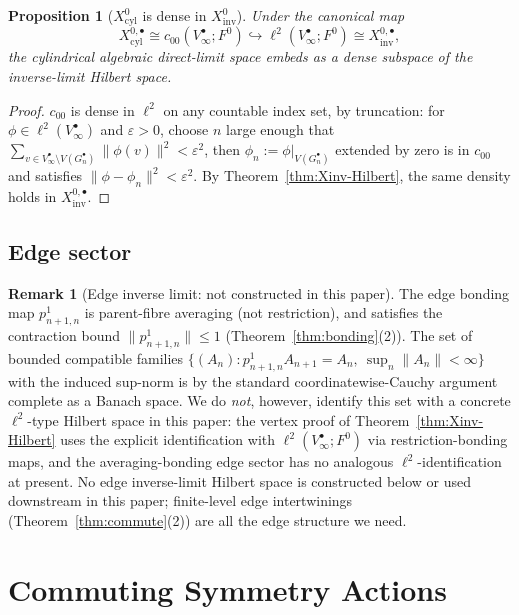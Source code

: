 \documentclass[11pt, a4paper]{amsart}
\newtheorem{proposition}[theorem]{Proposition}
\theoremstyle{definition}
\newtheorem{remark}[theorem]{Remark}
\newcommand{\inv}{\mathrm{inv}}
\newcommand{\cyl}{\mathrm{cyl}}
\begin{document}
\begin{proposition}[$X_\cyl^0$ is dense in $X_\inv^0$]
\label{prop:Xcyl-dense}
Under the canonical map
\[
  X_\cyl^{0, \bullet} \cong c_{00}(V_\infty^\bullet; F^0)
    \hookrightarrow \ell^2(V_\infty^\bullet; F^0) \cong
    X_\inv^{0, \bullet},
\]
the cylindrical algebraic direct-limit space embeds as a dense
subspace of the inverse-limit Hilbert space.
\end{proposition}

\begin{proof}
$c_{00}$ is dense in $\ell^2$ on any countable index set, by
truncation: for $\phi \in \ell^2(V_\infty^\bullet)$ and
$\varepsilon > 0$, choose $n$ large enough that $\sum_{v \in
V_\infty^\bullet \setminus V(G_n^\bullet)} \|\phi(v)\|^2 <
\varepsilon^2$, then $\phi_n := \phi|_{V(G_n^\bullet)}$ extended
by zero is in $c_{00}$ and satisfies $\|\phi - \phi_n\|^2 <
\varepsilon^2$. By Theorem~\ref{thm:Xinv-Hilbert}, the same
density holds in $X_\inv^{0, \bullet}$.
\end{proof}

\subsection{Edge sector}

\begin{remark}[Edge inverse limit: not constructed in this paper]
\label{rmk:edge-inv}
The edge bonding map $p_{n+1, n}^1$ is parent-fibre averaging
(not restriction), and satisfies the contraction bound
$\|p_{n+1,n}^1\| \leq 1$ (Theorem~\ref{thm:bonding}(2)). The set
of bounded compatible families
$\{(A_n) : p_{n+1, n}^1 A_{n+1} = A_n,\ \sup_n \|A_n\| < \infty\}$
with the induced sup-norm is by the standard coordinatewise-Cauchy
argument complete as a Banach space. We do \emph{not}, however,
identify this set with a concrete $\ell^2$-type Hilbert space in
this paper: the vertex proof of
Theorem~\ref{thm:Xinv-Hilbert} uses the explicit identification
with $\ell^2(V_\infty^\bullet; F^0)$ via restriction-bonding maps,
and the averaging-bonding edge sector has no analogous
$\ell^2$-identification at present. No edge inverse-limit Hilbert
space is constructed below or used downstream in this paper;
finite-level edge intertwinings (Theorem~\ref{thm:commute}(2))
are all the edge structure we need.
\end{remark}

\section{Commuting Symmetry Actions}
\label{sec:commute}
\end{document}
